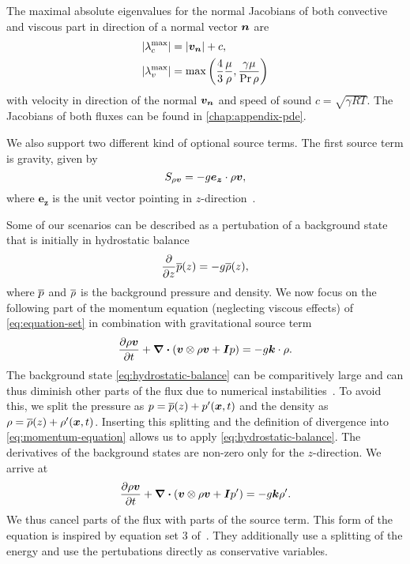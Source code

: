 The maximal absolute eigenvalues for the normal Jacobians of both convective and viscous part in direction of a normal vector $\bm{n}$ are
\begin{align}
  \begin{split}
    \maxConvEigen &=  \vert \Qv_{\normal} \vert + c,\\
    \maxViscEigen &= \max \left( \frac{4}{3} \frac{\mu}{\Qrho},
                        \frac{\gamma \mu}{\Pr \Qrho}\right)
  \end{split}
\end{align}
with velocity in direction of the normal $\bm{v}_{\bm{n}}$ and speed of sound $c = \sqrt{\gamma R T }$.
The Jacobians of both fluxes can be found in \cref{chap:appendix-pde}.

We also support two different kind of optional source terms.
The first source term is gravity, given by
\begin{equation}\label{eq:source-gravity}
  \source[\Qj] = - g \bm{e_z} \cdot \Qj,
\end{equation}
where $\bm{e_z}$ is the unit vector pointing in $z$-direction~\cite{giraldo2008study}.

\newcommand{\backgroundPressure}{\overline{\pressure}}
\newcommand{\backgroundRho}{\overline{\Qrho}}
Some of our scenarios can be described as a pertubation of a background state that is initially in hydrostatic balance
\begin{equation}
  \label{eq:hydrostatic-balance}
  \pdv{}{z} \backgroundPressure{\left (z \right )} = -g \backgroundRho(z),
\end{equation}
where $\backgroundPressure$ and $\backgroundRho$ is the background pressure and density.
We now focus on the following part of the momentum equation (neglecting viscous effects) of \cref{eq:equation-set} in combination with gravitational source term~
\begin{equation}
  \label{eq:momentum-equation}
  \pdv{\Qj}{t}+ \divergence{ \left(
    \Qv \otimes \Qj + \bm{I} \pressure
    \right)
  }
  =
  -g \bm{k} \cdot \Qrho.
\end{equation}
The background state \cref{eq:hydrostatic-balance} can be comparitively large and can thus diminish other parts of the flux due to numerical instabilities~\cite{muller2010adaptive}.
To avoid this, we split the pressure as $\pressure = \backgroundPressure(z) + \pressure' (\bm{x}, t)$ and the density as $\Qrho = \backgroundRho(z) + \Qrho'(\bm{x}, t)$.
Inserting this splitting and the definition of divergence into \cref{eq:momentum-equation} allows us to apply \cref{eq:hydrostatic-balance}.
The derivatives of the background states are non-zero only for the $z$-direction.
We arrive at 
\begin{equation}
  \label{eq:momentum-equation-split}
  \pdv{\Qj}{t}+ \divergence{ \left(
    \Qv \otimes \Qj + \bm{I} \pressure'
    \right)
  }
  =
  -g \bm{k} \Qrho'.
\end{equation}
We thus cancel parts of the flux with parts of the source term.
This form of the equation is inspired by equation set 3 of~\cite{giraldo2008study}.
They additionally use a splitting of the energy and use the pertubations directly as conservative variables.

